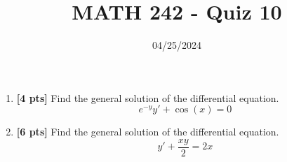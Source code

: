 \documentclass[12pt]{article}
\title{MATH 242 - Quiz 10}
\date{04/25/2024}
\begin{document}
\maketitle

\begin{enumerate}


\item \textbf{[4 pts]} Find the general solution of the differential equation.
$$e^{-y}y'+\cos(x)=0$$
\newpage

\item \textbf{[6 pts]} Find the general solution of the differential equation.
$$y'+\frac{xy}{2}=2x$$

\end{enumerate}
\end{document}
